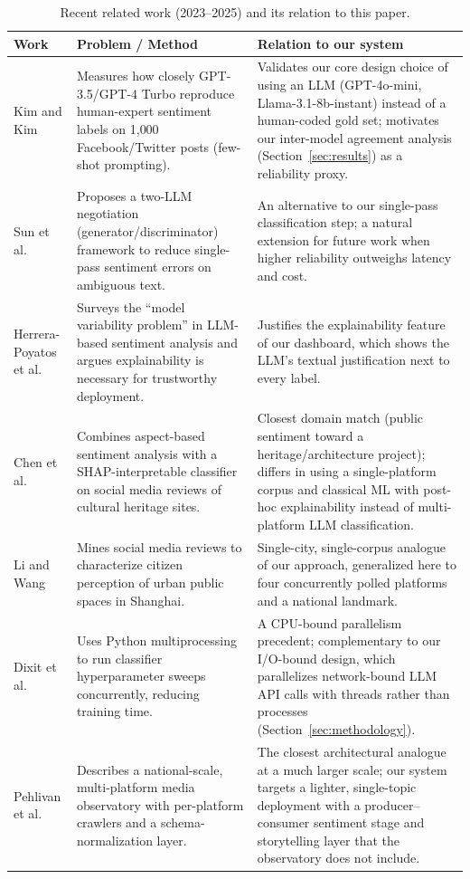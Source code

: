 \documentclass[runningheads]{llncs}
\begin{document}
\begin{table}[p]
\centering
\caption{Recent related work (2023--2025) and its relation to this paper.}
\label{tab:related}
\small
\setlength{\tabcolsep}{4pt}
\renewcommand{\arraystretch}{0.88}
\begin{tabular}{p{2.5cm}p{5.1cm}p{4.1cm}}
\toprule
\textbf{Work} & \textbf{Problem / Method} & \textbf{Relation to our system} \\
\midrule
Kim and Kim \cite{kim2025llm} &
Measures how closely GPT-3.5/GPT-4 Turbo reproduce human-expert sentiment
labels on 1{,}000 Facebook/Twitter posts (few-shot prompting). &
Validates our core design choice of using an LLM (GPT-4o-mini,
Llama-3.1-8b-instant) instead of a human-coded gold set; motivates our
inter-model agreement analysis (Section~\ref{sec:results}) as a reliability
proxy. \\
Sun et al.\ \cite{sun2023sentiment} &
Proposes a two-LLM negotiation (generator/discriminator) framework to reduce
single-pass sentiment errors on ambiguous text. &
An alternative to our single-pass classification step; a natural extension
for future work when higher reliability outweighs latency and cost. \\
Herrera-Poyatos et al.\ \cite{herrerapoyatos2025uncertainty} &
Surveys the ``model variability problem'' in LLM-based sentiment analysis
and argues explainability is necessary for trustworthy deployment. &
Justifies the explainability feature of our dashboard, which shows the
LLM's textual justification next to every label. \\
Chen et al.\ \cite{chen2025shap} &
Combines aspect-based sentiment analysis with a SHAP-interpretable
classifier on social media reviews of cultural heritage sites. &
Closest domain match (public sentiment toward a heritage/architecture
project); differs in using a single-platform corpus and classical ML with
post-hoc explainability instead of multi-platform LLM classification. \\
Li and Wang \cite{li2025shanghai} &
Mines social media reviews to characterize citizen perception of urban
public spaces in Shanghai. &
Single-city, single-corpus analogue of our approach, generalized here to
four concurrently polled platforms and a national landmark. \\
Dixit et al.\ \cite{dixit2023multiprocessing} &
Uses Python multiprocessing to run classifier hyperparameter sweeps
concurrently, reducing training time. &
A CPU-bound parallelism precedent; complementary to our I/O-bound design,
which parallelizes network-bound LLM API calls with threads rather than
processes (Section~\ref{sec:methodology}). \\
Pehlivan et al.\ \cite{pehlivan2025meo} &
Describes a national-scale, multi-platform media observatory with
per-platform crawlers and a schema-normalization layer. &
The closest architectural analogue at a much larger scale; our system
targets a lighter, single-topic deployment with a producer--consumer
sentiment stage and storytelling layer that the observatory does not
include. \\
\bottomrule
\end{tabular}
\end{table}
\end{document}
